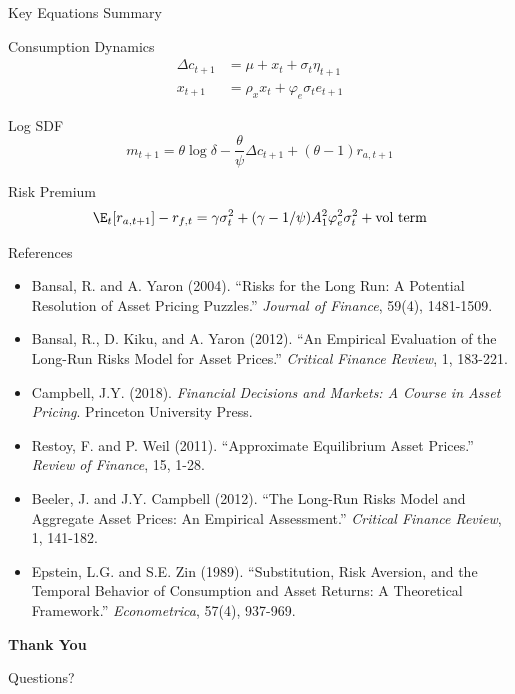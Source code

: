 \documentclass{beamer}
\begin{document}
\begin{frame}{Key Equations Summary}
    \begin{block}{Consumption Dynamics}
    \begin{align}
        \Delta c_{t+1} &= \mu + x_t + \sigma_t \eta_{t+1} \\
        x_{t+1} &= \rho_x x_t + \varphi_e \sigma_t e_{t+1}
    \end{align}
    \end{block}
    
    \begin{block}{Log SDF}
    \begin{equation}
        m_{t+1} = \theta \log \delta - \frac{\theta}{\psi} \Delta c_{t+1} + (\theta - 1) r_{a,t+1}
    \end{equation}
    \end{block}
    
    \begin{block}{Risk Premium}
    \begin{equation}
        \E_t[r_{a,t+1}] - r_{f,t} = \gamma \sigma_t^2 + (\gamma - 1/\psi) A_1^2 \varphi_e^2 \sigma_t^2 + \text{vol term}
    \end{equation}
    \end{block}
\end{frame}

\begin{frame}{References}
    \small
    \begin{itemize}
        \item Bansal, R. and A. Yaron (2004). ``Risks for the Long Run: A Potential Resolution of Asset Pricing Puzzles.'' \textit{Journal of Finance}, 59(4), 1481-1509.
        
        \item Bansal, R., D. Kiku, and A. Yaron (2012). ``An Empirical Evaluation of the Long-Run Risks Model for Asset Prices.'' \textit{Critical Finance Review}, 1, 183-221.
        
        \item Campbell, J.Y. (2018). \textit{Financial Decisions and Markets: A Course in Asset Pricing}. Princeton University Press.
        
        \item Restoy, F. and P. Weil (2011). ``Approximate Equilibrium Asset Prices.'' \textit{Review of Finance}, 15, 1-28.
        
        \item Beeler, J. and J.Y. Campbell (2012). ``The Long-Run Risks Model and Aggregate Asset Prices: An Empirical Assessment.'' \textit{Critical Finance Review}, 1, 141-182.
        
        \item Epstein, L.G. and S.E. Zin (1989). ``Substitution, Risk Aversion, and the Temporal Behavior of Consumption and Asset Returns: A Theoretical Framework.'' \textit{Econometrica}, 57(4), 937-969.
    \end{itemize}
\end{frame}

\begin{frame}
    \begin{center}
        \Huge \textbf{Thank You}
        
        \vspace{1cm}
        \large Questions?
    \end{center}
\end{frame}
\end{document}
